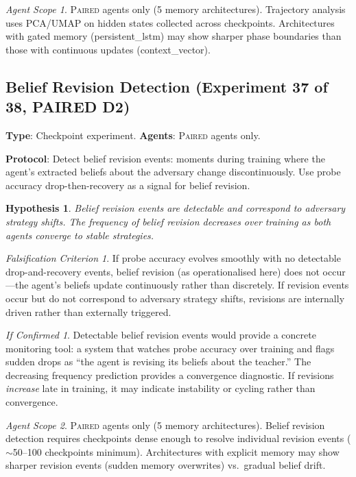\documentclass[11pt,a4paper]{article}
\newtheorem{hypothesis}{Hypothesis}[subsection]
\theoremstyle{remark}
\newtheorem*{falsification}{Falsification Criterion}
\newtheorem*{implication}{If Confirmed}
\newtheorem*{agentscope}{Agent Scope}
\newcommand{\paired}{\textsc{Paired}}
\begin{document}
\begin{agentscope}
\paired{} agents only (5 memory architectures). Trajectory analysis uses PCA/UMAP on hidden states collected across checkpoints. Architectures with gated memory (persistent\_lstm) may show sharper phase boundaries than those with continuous updates (context\_vector).
\end{agentscope}

\subsection{Belief Revision Detection (Experiment 37 of 38, PAIRED D2)}
\label{exp:belief_revision_detection}

\textbf{Type}: Checkpoint experiment. \textbf{Agents}: \paired{} agents only.

\textbf{Protocol}: Detect belief revision events: moments during training where the agent's extracted beliefs about the adversary change discontinuously. Use probe accuracy drop-then-recovery as a signal for belief revision.

\begin{hypothesis}
Belief revision events are detectable and correspond to adversary strategy shifts. The frequency of belief revision decreases over training as both agents converge to stable strategies.
\end{hypothesis}

\begin{falsification}
If probe accuracy evolves smoothly with no detectable drop-and-recovery events, belief revision (as operationalised here) does not occur---the agent's beliefs update continuously rather than discretely. If revision events occur but do not correspond to adversary strategy shifts, revisions are internally driven rather than externally triggered.
\end{falsification}

\begin{implication}
Detectable belief revision events would provide a concrete monitoring tool: a system that watches probe accuracy over training and flags sudden drops as ``the agent is revising its beliefs about the teacher.'' The decreasing frequency prediction provides a convergence diagnostic. If revisions \textit{increase} late in training, it may indicate instability or cycling rather than convergence.
\end{implication}

\begin{agentscope}
\paired{} agents only (5 memory architectures). Belief revision detection requires checkpoints dense enough to resolve individual revision events ($\sim$50--100 checkpoints minimum). Architectures with explicit memory may show sharper revision events (sudden memory overwrites) vs.\ gradual belief drift.
\end{agentscope}
\end{document}

